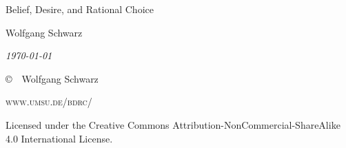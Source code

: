\documentclass{../wobook2017}
\begin{document}
\begingroup
\thispagestyle{empty}

\begin{center}


{\huge Belief, Desire, and Rational Choice\par}

\vspace{10mm}

{\Large Wolfgang Schwarz}

\vspace{10mm}

{\normalsize \textit{\today}}

\end{center}

\vfill
\endgroup
{
\small

\noindent \copyright\ \the\year\ Wolfgang Schwarz

\noindent \textsc{www.umsu.de/bdrc/}

\noindent Licensed under the Creative Commons Attribution-NonCommercial-ShareAlike 4.0 International License.

}


\tableofcontents 


\end{document}
